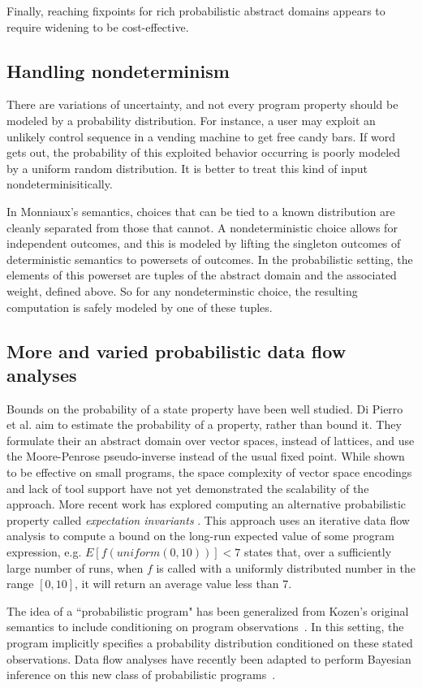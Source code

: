 Finally, reaching fixpoints for rich probabilistic abstract domains
appears to require widening \cite{monniaux2000abstract,esparza2011probabilistic} to be
cost-effective.

\subsection{Handling nondeterminism}

There are variations of uncertainty,
and not every program property should be modeled by a
probability distribution.
For instance, a user may exploit an unlikely control sequence
in a vending machine to get free candy bars. 
If word gets out, the probability of
this exploited behavior occurring is poorly modeled by a uniform 
random distribution.
It is better to treat this kind of input nondeterminisitically.

In Monniaux's semantics, choices that can be tied to a known
distribution are cleanly separated from those that cannot.
A nondeterministic choice allows for independent outcomes, and
this is modeled by lifting the singleton outcomes of deterministic
semantics to powersets of outcomes.
In the probabilistic setting, the elements of this powerset are
tuples of the abstract domain and the associated weight, defined
above.
So for any nondeterminstic choice, the resulting computation 
is safely modeled by one of these tuples.

\subsection{More and varied probabilistic data flow analyses}

Bounds on the probability of a state property have been well studied.
Di Pierro et al. \cite{di2013probabilistic} aim to estimate the probability of a property,
rather than bound it.  They formulate their an abstract 
domain over vector spaces, instead of lattices, and use
the Moore-Penrose pseudo-inverse instead of the usual fixed point.
While shown to be effective on small programs, the space
complexity of vector space encodings and lack of tool support
have not yet demonstrated the scalability of the approach.
More recent work has explored computing an alternative probabilistic
property called {\sl expectation invariants} \cite{chakarov2014expectation}.
This approach uses an iterative data flow analysis to 
compute a bound on the long-run expected value of
some program expression, e.g. $E[f(uniform(0,10))] < 7$ states that,
over a sufficiently large number of runs, when $f$ is called with
a uniformly distributed number in the range $[0,10]$, it will return
an average value less than 7.

The idea of a ``probabilistic program" has been generalized from
Kozen's original semantics to include conditioning on program
observations~\cite{Gordon2014}.
In this setting, the program implicitly specifies a probability 
distribution conditioned on these stated observations.
Data flow analyses have recently been adapted to perform Bayesian
inference on this new class of probabilistic 
programs~\cite{claret2013bayesian}.  

